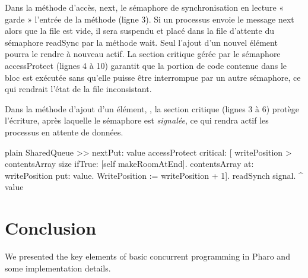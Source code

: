 \documentclass[10pt,twoside,english]{_support/latex/sbabook/sbabook}
\begin{document}
Dans la m\'{e}thode d’acc\`{e}s, next, le s\'{e}maphore de synchronisation en lecture « garde » l’entr\'{e}e de la m\'{e}thode (ligne 3). Si un processus envoie le message next alors que la file est vide, il sera suspendu et plac\'{e} dans la file d’attente du s\'{e}maphore readSync par la m\'{e}thode wait. Seul l’ajout d’un nouvel \'{e}l\'{e}ment pourra le rendre \`{a} nouveau actif. La section critique g\'{e}r\'{e}e par le s\'{e}maphore accessProtect (lignes 4 \`{a} 10) garantit que la portion de code contenue dans le bloc est ex\'{e}cut\'{e}e sans qu’elle puisse \^{e}tre interrompue par un autre s\'{e}maphore, ce qui rendrait l’\'{e}tat de la file inconsistant.

Dans la m\'{e}thode d’ajout d’un \'{e}l\'{e}ment, , la section critique (lignes 3 \`{a} 6) prot\`{e}ge l’\'{e}criture, apr\`{e}s laquelle le s\'{e}maphore  est \textit{signal\'{e}e}, ce qui rendra actif les processus en attente de donn\'{e}es.

\begin{displaycode}{plain}
SharedQueue >> nextPut: value 
	accessProtect
		critical: [ writePosition > contentsArray size
				ifTrue: [self makeRoomAtEnd].
			contentsArray at: writePosition put: value.
			WritePosition := writePosition + 1].
			readSynch signal.
			^ value
\end{displaycode}
\section{Conclusion}
We presented the key elements of basic concurrent programming in Pharo and some implementation details.


\backmatter

\end{document}
